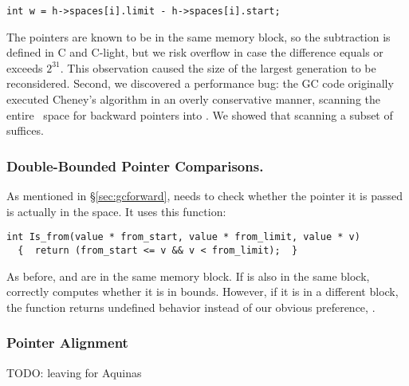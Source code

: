 \begin{lstlisting}[numbers=none]
  int w = h->spaces[i].limit - h->spaces[i].start;
\end{lstlisting}

The pointers are known to be in 
the same memory block, so the subtraction is defined in C and C-light, but
we risk overflow in case the difference equals 
or exceeds $2^{31}$. This observation caused the size of the largest generation 
to be reconsidered. Second, we discovered a performance bug: the GC code 
originally executed Cheney's algorithm in an overly conservative manner, 
scanning the entire~ space for backward pointers into . We
showed that scanning a subset of  suffices.

\subsubsection*{Double-Bounded Pointer Comparisons.}
As mentioned in \S\ref{sec:gcforward},  needs to 
check whether the pointer it is passed is actually in the 
space. It uses this function: 

\begin{lstlisting}[numbers=none]
  int Is_from(value * from_start, value * from_limit, value * v) 
  {  return (from_start <= v && v < from_limit);  }
\end{lstlisting}

As before,  and  are in the same 
memory block. If  is also in the same block,  
correctly computes whether it is in bounds.
However, if it is in a different block, the function returns undefined behavior instead of our obvious preference, .


\subsubsection*{Pointer Alignment}
{\color{red}TODO: leaving for Aquinas}
